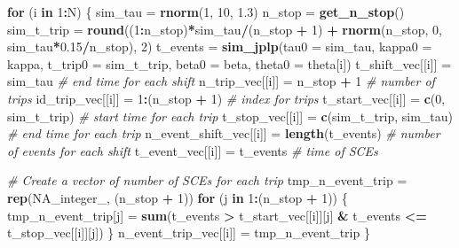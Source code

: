 \documentclass[
]{article}
\newenvironment{Shaded}{\begin{snugshade}}{\end{snugshade}}
\newcommand{\CommentTok}[1]{\textcolor[rgb]{0.56,0.35,0.01}{\textit{#1}}}
\newcommand{\ControlFlowTok}[1]{\textcolor[rgb]{0.13,0.29,0.53}{\textbf{#1}}}
\newcommand{\DataTypeTok}[1]{\textcolor[rgb]{0.13,0.29,0.53}{#1}}
\newcommand{\DecValTok}[1]{\textcolor[rgb]{0.00,0.00,0.81}{#1}}
\newcommand{\FloatTok}[1]{\textcolor[rgb]{0.00,0.00,0.81}{#1}}
\newcommand{\KeywordTok}[1]{\textcolor[rgb]{0.13,0.29,0.53}{\textbf{#1}}}
\newcommand{\NormalTok}[1]{#1}
\newcommand{\OperatorTok}[1]{\textcolor[rgb]{0.81,0.36,0.00}{\textbf{#1}}}
\newcommand{\OtherTok}[1]{\textcolor[rgb]{0.56,0.35,0.01}{#1}}
\newcommand{\StringTok}[1]{\textcolor[rgb]{0.31,0.60,0.02}{#1}}
\begin{document}
\begin{Shaded}
\begin{Highlighting}[]
  \ControlFlowTok{for}\NormalTok{ (i }\ControlFlowTok{in} \DecValTok{1}\OperatorTok{:}\NormalTok{N)}
\NormalTok{  \{}
\NormalTok{    sim_tau =}\StringTok{ }\KeywordTok{rnorm}\NormalTok{(}\DecValTok{1}\NormalTok{, }\DecValTok{10}\NormalTok{, }\FloatTok{1.3}\NormalTok{)}
\NormalTok{    n_stop =}\StringTok{ }\KeywordTok{get_n_stop}\NormalTok{()}
\NormalTok{    sim_t_trip =}\StringTok{ }\KeywordTok{round}\NormalTok{((}\DecValTok{1}\OperatorTok{:}\NormalTok{n_stop)}\OperatorTok{*}\NormalTok{sim_tau}\OperatorTok{/}\NormalTok{(n_stop }\OperatorTok{+}\StringTok{ }\DecValTok{1}\NormalTok{) }\OperatorTok{+}
\StringTok{                         }\KeywordTok{rnorm}\NormalTok{(n_stop, }\DecValTok{0}\NormalTok{, sim_tau}\OperatorTok{*}\FloatTok{0.15}\OperatorTok{/}\NormalTok{n_stop), }\DecValTok{2}\NormalTok{)}
\NormalTok{    t_events =}\StringTok{ }\KeywordTok{sim_jplp}\NormalTok{(}\DataTypeTok{tau0 =}\NormalTok{ sim_tau,}
                        \DataTypeTok{kappa0 =}\NormalTok{ kappa,}
                        \DataTypeTok{t_trip0 =}\NormalTok{ sim_t_trip,}
                        \DataTypeTok{beta0 =}\NormalTok{ beta,}
                        \DataTypeTok{theta0 =}\NormalTok{ theta[i])}
\NormalTok{    t_shift_vec[[i]] =}\StringTok{ }\NormalTok{sim_tau                }\CommentTok{# end time for each shift}
\NormalTok{    n_trip_vec[[i]] =}\StringTok{ }\NormalTok{n_stop }\OperatorTok{+}\StringTok{ }\DecValTok{1}              \CommentTok{# number of trips}
\NormalTok{    id_trip_vec[[i]] =}\StringTok{ }\DecValTok{1}\OperatorTok{:}\NormalTok{(n_stop }\OperatorTok{+}\StringTok{ }\DecValTok{1}\NormalTok{)         }\CommentTok{# index for trips}
\NormalTok{    t_start_vec[[i]] =}\StringTok{ }\KeywordTok{c}\NormalTok{(}\DecValTok{0}\NormalTok{, sim_t_trip)       }\CommentTok{# start time for each trip}
\NormalTok{    t_stop_vec[[i]]  =}\StringTok{ }\KeywordTok{c}\NormalTok{(sim_t_trip, sim_tau) }\CommentTok{# end time for each trip}
\NormalTok{    n_event_shift_vec[[i]] =}\StringTok{ }\KeywordTok{length}\NormalTok{(t_events) }\CommentTok{# number of events for each shift}
\NormalTok{    t_event_vec[[i]] =}\StringTok{ }\NormalTok{t_events               }\CommentTok{# time of SCEs}

    \CommentTok{# Create a vector of number of SCEs for each trip}
\NormalTok{    tmp_n_event_trip =}\StringTok{ }\KeywordTok{rep}\NormalTok{(}\OtherTok{NA_integer_}\NormalTok{, (n_stop }\OperatorTok{+}\StringTok{ }\DecValTok{1}\NormalTok{))}
    \ControlFlowTok{for}\NormalTok{ (j }\ControlFlowTok{in} \DecValTok{1}\OperatorTok{:}\NormalTok{(n_stop }\OperatorTok{+}\StringTok{ }\DecValTok{1}\NormalTok{)) \{}
\NormalTok{      tmp_n_event_trip[j] =}\StringTok{ }\KeywordTok{sum}\NormalTok{(t_events }\OperatorTok{>}\StringTok{ }\NormalTok{t_start_vec[[i]][j] }\OperatorTok{&}
\StringTok{                                  }\NormalTok{t_events }\OperatorTok{<=}\StringTok{ }\NormalTok{t_stop_vec[[i]][j])}
\NormalTok{    \}}
\NormalTok{    n_event_trip_vec[[i]] =}\StringTok{ }\NormalTok{tmp_n_event_trip}
\NormalTok{  \}}


\end{Highlighting}
\end{Shaded}
\end{document}
